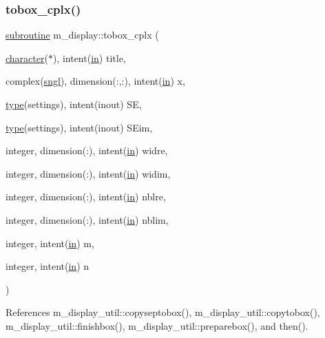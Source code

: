 \subsubsection{\texorpdfstring{tobox\+\_\+cplx()}{tobox\_cplx()}}
{\footnotesize\ttfamily \hyperlink{M__stopwatch_83_8txt_acfbcff50169d691ff02d4a123ed70482}{subroutine} m\+\_\+display\+::tobox\+\_\+cplx (\begin{DoxyParamCaption}\item[{\hyperlink{option__stopwatch_83_8txt_abd4b21fbbd175834027b5224bfe97e66}{character}($\ast$), intent(\hyperlink{M__journal_83_8txt_afce72651d1eed785a2132bee863b2f38}{in})}]{title,  }\item[{complex(\hyperlink{namespacem__display_a2ac86bc535c3ccc5947dbb3109c666b5}{sngl}), dimension(\+:,\+:), intent(\hyperlink{M__journal_83_8txt_afce72651d1eed785a2132bee863b2f38}{in})}]{x,  }\item[{\hyperlink{stop__watch_83_8txt_a70f0ead91c32e25323c03265aa302c1c}{type}(settings), intent(inout)}]{SE,  }\item[{\hyperlink{stop__watch_83_8txt_a70f0ead91c32e25323c03265aa302c1c}{type}(settings), intent(inout)}]{S\+Eim,  }\item[{integer, dimension(\+:), intent(\hyperlink{M__journal_83_8txt_afce72651d1eed785a2132bee863b2f38}{in})}]{widre,  }\item[{integer, dimension(\+:), intent(\hyperlink{M__journal_83_8txt_afce72651d1eed785a2132bee863b2f38}{in})}]{widim,  }\item[{integer, dimension(\+:), intent(\hyperlink{M__journal_83_8txt_afce72651d1eed785a2132bee863b2f38}{in})}]{nblre,  }\item[{integer, dimension(\+:), intent(\hyperlink{M__journal_83_8txt_afce72651d1eed785a2132bee863b2f38}{in})}]{nblim,  }\item[{integer, intent(\hyperlink{M__journal_83_8txt_afce72651d1eed785a2132bee863b2f38}{in})}]{m,  }\item[{integer, intent(\hyperlink{M__journal_83_8txt_afce72651d1eed785a2132bee863b2f38}{in})}]{n }\end{DoxyParamCaption})\hspace{0.3cm}{\ttfamily [private]}}



References m\+\_\+display\+\_\+util\+::copyseptobox(), m\+\_\+display\+\_\+util\+::copytobox(), m\+\_\+display\+\_\+util\+::finishbox(), m\+\_\+display\+\_\+util\+::preparebox(), and then().

